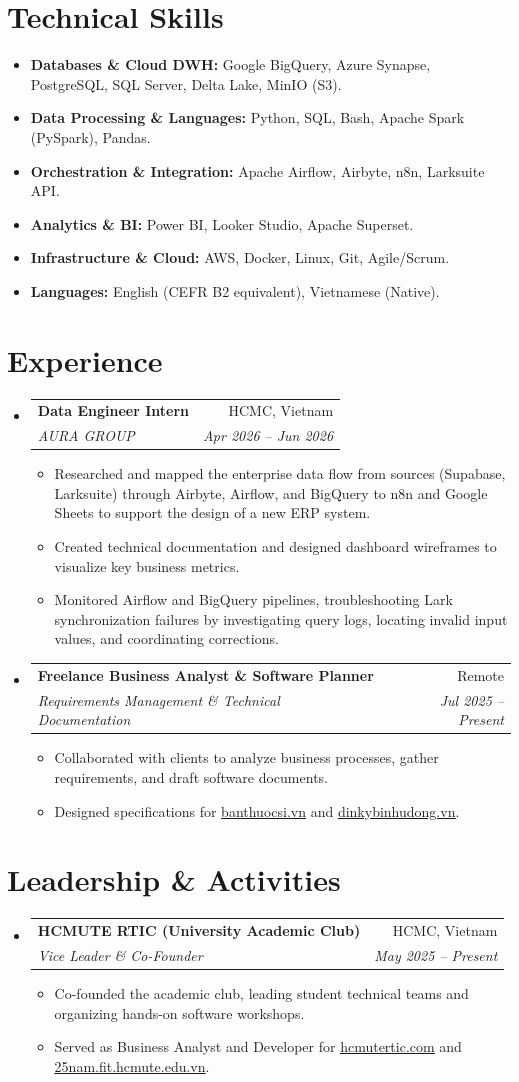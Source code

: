 \documentclass[10pt,a4paper]{article}
\makeatletter
\newcommand{\resumeItem}[1]{
  \item\small{
    {#1 \vspace{-2pt}}
  }
}
\newcommand{\resumeSubheading}[4]{
  \vspace{-1pt}\item
    \begin{tabular*}{0.97\textwidth}[t]{l@{\extracolsep{\fill}}r}
      \textbf{#1} & \small#2 \\
      \textit{\small#3} & \textit{\small #4} \\
    \end{tabular*}\vspace{-5pt}
}
\newcommand{\resumeSubHeadingListStart}{\begin{itemize}[leftmargin=0.15in, label={}]}
\newcommand{\resumeSubHeadingListEnd}{\end{itemize}}
\newcommand{\resumeItemListStart}{\begin{itemize}}
\newcommand{\resumeItemListEnd}{\end{itemize}\vspace{-5pt}}
\makeatother
\begin{document}
\section{Technical Skills}
  \resumeSubHeadingListStart
    \resumeItemListStart
        \resumeItem{\textbf{Databases \& Cloud DWH:} Google BigQuery, Azure Synapse, PostgreSQL, SQL Server, Delta Lake, MinIO (S3).}
        \resumeItem{\textbf{Data Processing \& Languages:} Python, SQL, Bash, Apache Spark (PySpark), Pandas.}
        \resumeItem{\textbf{Orchestration \& Integration:} Apache Airflow, Airbyte, n8n, Larksuite API.}
        \resumeItem{\textbf{Analytics \& BI:} Power BI, Looker Studio, Apache Superset.}
        \resumeItem{\textbf{Infrastructure \& Cloud:} AWS, Docker, Linux, Git, Agile/Scrum.}
        \resumeItem{\textbf{Languages:} English (CEFR B2 equivalent), Vietnamese (Native).}
    \resumeItemListEnd
  \resumeSubHeadingListEnd

\section{Experience}
  \resumeSubHeadingListStart
    \resumeSubheading
      {Data Engineer Intern}{HCMC, Vietnam}
      {AURA GROUP}{Apr 2026 -- Jun 2026}
      \resumeItemListStart
        \resumeItem{Researched and mapped the enterprise data flow from sources (Supabase, Larksuite) through Airbyte, Airflow, and BigQuery to n8n and Google Sheets to support the design of a new ERP system.}
        \resumeItem{Created technical documentation and designed dashboard wireframes to visualize key business metrics.}
        \resumeItem{Monitored Airflow and BigQuery pipelines, troubleshooting Lark synchronization failures by investigating query logs, locating invalid input values, and coordinating corrections.}
      \resumeItemListEnd

    \resumeSubheading
      {Freelance Business Analyst \& Software Planner}{Remote}
      {Requirements Management \& Technical Documentation}{Jul 2025 -- Present}
      \resumeItemListStart
        \resumeItem{Collaborated with clients to analyze business processes, gather requirements, and draft software documents.}
        \resumeItem{Designed specifications for \href{https://banthuocsi.vn}{\underline{banthuocsi.vn}} and \href{https://dinkybinhudong.vn}{\underline{dinkybinhudong.vn}}.}
      \resumeItemListEnd
  \resumeSubHeadingListEnd

\section{Leadership \& Activities}
  \resumeSubHeadingListStart
    \resumeSubheading
      {HCMUTE RTIC (University Academic Club)}{HCMC, Vietnam}
      {Vice Leader \& Co-Founder}{May 2025 -- Present}
      \resumeItemListStart
        \resumeItem{Co-founded the academic club, leading student technical teams and organizing hands-on software workshops.}
        \resumeItem{Served as Business Analyst and Developer for \href{https://hcmutertic.com}{\underline{hcmutertic.com}} and \href{https://25nam.fit.hcmute.edu.vn/home}{\underline{25nam.fit.hcmute.edu.vn}}.}
      \resumeItemListEnd
  \resumeSubHeadingListEnd
\end{document}
